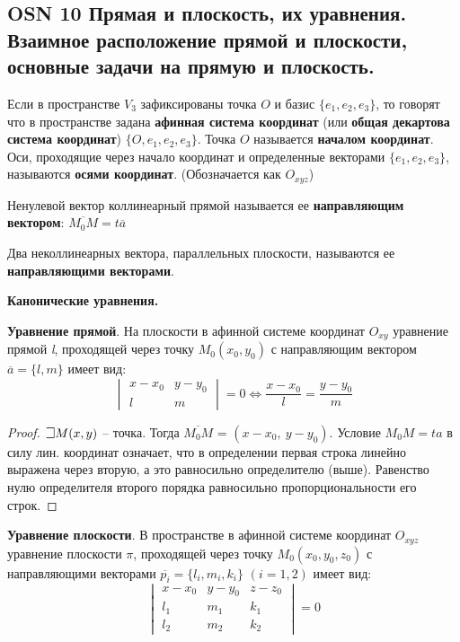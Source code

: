 \subsection{OSN 10 Прямая и плоскость, их уравнения. Взаимное расположение прямой и плоскости,  основные задачи на прямую и плоскость.}

Если в пространстве $V_3$ зафиксированы точка $O$ и базис $\{e_1, e_2, e_3\}$, то говорят что в пространстве задана \textbf{афинная система координат} (или \textbf{общая декартова система координат}) $\{O, e_1, e_2, e_3\}$. Точка $O$ называется \textbf{началом координат}. Оси, проходящие через начало координат и определенные векторами $\{e_1, e_2, e_3\}$, называются \textbf{осями координат}. (Обозначается как $O_{xyz}$)

Ненулевой вектор коллинеарный прямой называется ее \textbf{направляющим вектором}: $\overline{M_0M} = t \overline{a}$   

Два неколлинеарных вектора, параллельных плоскости, называются ее \textbf{направляющими векторами}. 


\bigbreak
\centerline{\textbf{Канонические уравнения.}}

\textbf{Уравнение прямой}. На плоскости в афинной системе координат $O_{xy}$ уравнение прямой \textit{l}, проходящей через точку $M_0(x_0,y_0)$ с направляющим вектором $\overline{a}=\{l,m\}$ имеет вид:
$$\begin{vmatrix} x-x_0 & y-y_0 \\ l & m \end{vmatrix} = 0 \iff \frac{x-x_0}{l} = \frac{y-y_0}{m} $$
\begin{proof}
$\mathLet M(x,y)$ -- точка. Тогда $\overline{M_0M}$ = $(x - x_0, ~ y - y_0)$. Условие $M_0M = ta$ в силу лин. координат означает, что в определении первая строка линейно выражена через вторую, а это равносильно определителю (выше). Равенство нулю определителя второго порядка равносильно пропорциональности его строк.
\end{proof}


\textbf{Уравнение плоскости}. 
В пространстве в афинной системе координат $O_{xyz}$ уравнение плоскости $\pi$, проходящей через точку $M_0(x_0,y_0,z_0)$ с направляющими векторами $\overline{p_i}=\{l_i,m_i,k_i\}$ $(i=1,2)$ имеет вид:
$$\begin{vmatrix} x-x_0 & y-y_0 & z-z_0\\ l_1 & m_1 & k_1 \\ l_2 & m_2 & k_2 \end{vmatrix} = 0 $$

